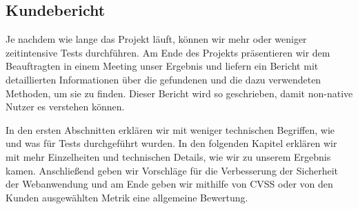\subsection{Kundebericht}

Je nachdem wie lange das Projekt läuft, können wir mehr oder weniger zeitintensive Tests durchführen. Am Ende des Projekts präsentieren wir dem Beauftragten in einem Meeting unser Ergebnis und liefern ein Bericht mit detaillierten Informationen über die gefundenen  und die dazu verwendeten Methoden, um sie zu finden. Dieser Bericht wird so geschrieben, damit non-native Nutzer es verstehen können. 

In den ersten Abschnitten erklären wir mit weniger technischen Begriffen, wie und was für Tests durchgeführt wurden. In den folgenden Kapitel erklären wir mit mehr Einzelheiten und technischen Details, wie wir zu unserem Ergebnis kamen. Anschließend geben wir Vorschläge für die Verbesserung der Sicherheit der Webanwendung und am Ende geben wir mithilfe von \gls{CVSS} oder von den Kunden ausgewählten Metrik eine allgemeine Bewertung.
